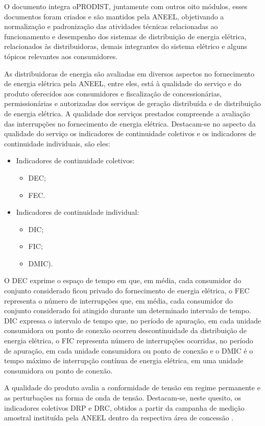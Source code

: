 \par 
O documento \cite{MOD08} integra o\ac{PRODIST}, juntamente com outros oito módulos, esses documentos foram criados e são mantidos pela \ac{ANEEL}, objetivando a normalização e padronização das atividades técnicas relacionadas ao funcionamento e desempenho dos sistemas de distribuição de energia elétrica, relacionados às distribuidoras, demais integrantes do sistema elétrico e alguns tópicos relevantes aos consumidores.
\par
As distribuidoras de energia são avaliadas em diversos aspectos no fornecimento de energia elétrica pela ANEEL, entre eles, está à qualidade do serviço e do produto oferecidos aos consumidores e fiscalização de concessionárias, permissionárias e autorizadas dos serviços de geração distribuída e de distribuição de energia elétrica. A qualidade dos serviços prestados compreende a avaliação das interrupções no fornecimento de energia elétrica. Destacam-se no aspecto da qualidade do serviço os indicadores de continuidade coletivos e os indicadores de continuidade individuais, são eles:
\begin{itemize}
\item Indicadores de continuidade coletivos:
	\begin{itemize}
		\item \ac{DEC}; 
		\item \ac{FEC}.	
	\end{itemize}
\item Indicadores de continuidade individual:
	\begin{itemize}
		\item \ac{DIC};
		\item \ac{FIC};
		\item \ac{DMIC}).
	\end{itemize}
\end{itemize}
\par
O \ac{DEC} exprime o espaço de tempo em que, em média, cada consumidor do conjunto considerado ficou privado do fornecimento de energia elétrica, o \ac{FEC} representa o número de interrupções que, em média, cada consumidor do conjunto considerado foi atingido durante um determinado intervalo de tempo. \ac{DIC} expressa o intervalo de tempo que, no período de apuração, em cada unidade consumidora ou ponto de conexão ocorreu descontinuidade da distribuição de energia elétrica, o \ac{FIC} representa número de interrupções ocorridas, no período de apuração, em cada unidade consumidora ou ponto de conexão e o \ac{DMIC} é o tempo máximo de interrupção contínua de energia elétrica, em uma unidade consumidora ou ponto de conexão.
\par 
A qualidade do produto avalia a conformidade de tensão em regime permanente e as perturbações na forma de onda de tensão. Destacam-se, neste quesito, os indicadores coletivos \ac{DRP} e \ac{DRC}, obtidos a partir da campanha de medição amostral instituída pela \ac{ANEEL} dentro da respectiva área de concessão \citep{ANEE2}.

